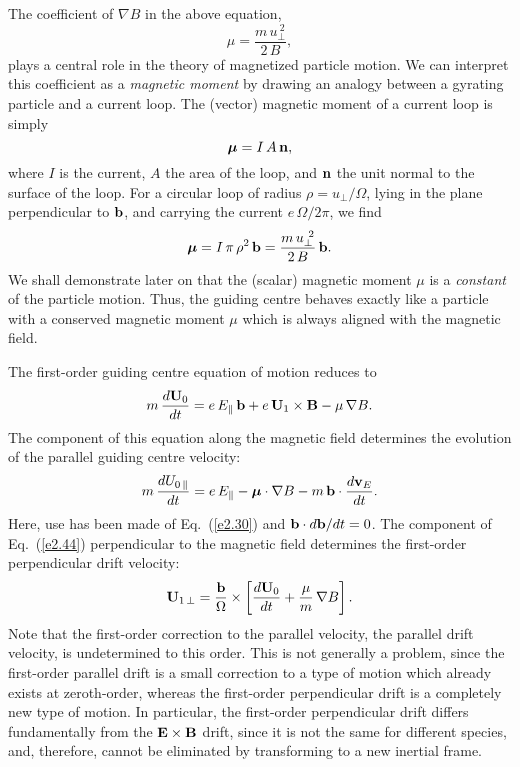 The coefficient of $\nabla B$ in the above equation,
\begin{equation}
\mu = \frac{m\,u_\perp^{~2}}{2\,B},
\end{equation}
plays a central role in the theory of magnetized particle motion. We can
interpret this coefficient as a {\em magnetic moment}\/ by drawing an analogy
between a gyrating particle and a current loop. The (vector) magnetic moment of
a current loop is simply
\begin{equation}
\mbox{\boldmath$\mu$} = I\,A\,{\bf n},
\end{equation}
where $I$ is the current, $A$ the area of the loop, and ${\bf n}$ the
unit normal to the surface of the loop. For a circular loop of
radius $\rho = u_\perp/{\Omega}$, lying in the
plane perpendicular to ${\bf b}$, and carrying the current $e\,{\Omega}/2\pi$,
we find
\begin{equation}
\mbox{\boldmath$\mu$} = I\,\pi\,\rho^2\,{\bf b} = \frac{m\,u_\perp^{~2}}{2\,B}\,{\bf b}.
\end{equation}
We shall  demonstrate later on that the (scalar) magnetic moment $\mu$ is a
{\em constant}\/ of the particle motion. Thus, the guiding centre behaves
exactly  like a particle with a conserved magnetic moment $\mu$ which
is always aligned with the magnetic field. 

The first-order guiding centre equation of motion reduces to
\begin{equation}\label{e2.44}
m \,\frac{d{\bf U}_0}{dt} = e\,E_\parallel\,{\bf b} + e\,{\bf U}_1\times {\bf B}
-\mu\,\nabla B.
\end{equation}
The component of this equation along the magnetic field determines the evolution
of the parallel guiding centre velocity:
\begin{equation}\label{e2.45}
m\,\frac{dU_{0\,\parallel}}{dt} = e\,E_\parallel - \mbox{\boldmath$\mu$}\cdot\nabla B
- m\,{\bf b}\cdot\frac{d{\bf v}_E}{dt}.
\end{equation}
Here, use has been made of Eq.~(\ref{e2.30}) and ${\bf b}\cdot d{\bf b}/dt=0$. 
The component of Eq.~(\ref{e2.44}) perpendicular to the magnetic field determines the
first-order perpendicular drift velocity:
\begin{equation}\label{e2.46}
{\bf U}_{1\,\perp} = \frac{{\bf b}}{{\Omega}} \times\left[
\frac{d{\bf U}_0}{dt} + \frac{\mu}{m}\,\nabla B\right].
\end{equation}
Note that the first-order correction to the parallel velocity, the parallel
drift velocity, is undetermined to this order. This is not generally a problem,
since the first-order parallel drift  is a small correction to a type of motion
which already exists at zeroth-order, whereas the first-order perpendicular drift is
a completely new type of motion. In particular, the first-order
perpendicular drift differs
fundamentally from the ${\bf E}\times{\bf B}$ drift, since it is
not the same for different species, and, therefore, cannot be eliminated by transforming
to a new inertial frame. 

